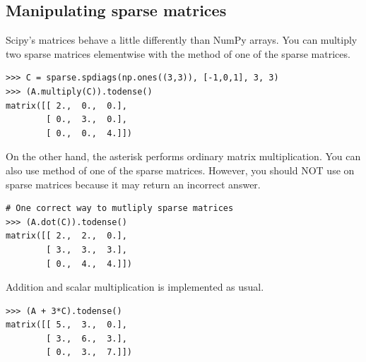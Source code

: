 \subsection*{Manipulating sparse matrices}
Scipy's  matrices behave a little differently than NumPy arrays.
You can multiply two sparse matrices elementwise with the  method of one of the sparse matrices.
\begin{lstlisting}
>>> C = sparse.spdiags(np.ones((3,3)), [-1,0,1], 3, 3)
>>> (A.multiply(C)).todense()
matrix([[ 2.,  0.,  0.],
        [ 0.,  3.,  0.],
        [ 0.,  0.,  4.]])
\end{lstlisting}

On the other hand, the asterisk \li{*} performs ordinary matrix multiplication. 
You can also use  method of one of the sparse matrices. 
However, you should NOT use  on sparse matrices because it may return an incorrect answer.
\begin{lstlisting}
# One correct way to mutliply sparse matrices
>>> (A.dot(C)).todense()
matrix([[ 2.,  2.,  0.],
        [ 3.,  3.,  3.],
        [ 0.,  4.,  4.]])
\end{lstlisting}

Addition and scalar multiplication is implemented as usual.
\begin{lstlisting}
>>> (A + 3*C).todense()
matrix([[ 5.,  3.,  0.],
        [ 3.,  6.,  3.],
        [ 0.,  3.,  7.]])
\end{lstlisting}




